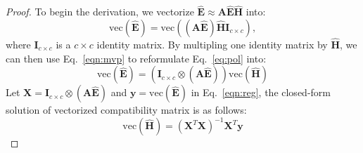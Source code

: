 \begin{proof}
To begin the derivation, we vectorize $\hat{{\boldsymbol E}} \approx {\boldsymbol A}\hat{{\boldsymbol E}}\hat{{\boldsymbol H}}$ into:
\begin{equation} \label{eq:pol}
    \text{vec}{(\hat{{\boldsymbol E}})} = \text{vec}{(({\boldsymbol A}\hat{{\boldsymbol E}})\hat{{\boldsymbol H}}{\boldsymbol I}_{c \times c})},
\end{equation}
where ${\boldsymbol I}_{c \times c}$ is a $c \times c$ identity matrix. 
By multipling one identity matrix by $\hat{{\boldsymbol H}}$, we can then use Eq.~\ref{eqn:mvp} to reformulate Eq.~\ref{eq:pol} into:
\begin{equation}
\text{vec}{(\hat{{\boldsymbol E}})} = ({\boldsymbol I}_{c \times c} \otimes ({\boldsymbol A}\hat{{\boldsymbol E}}))\text{vec}{(\hat{{\boldsymbol H}})}
\end{equation}
Let ${\boldsymbol X} = {\boldsymbol I}_{c \times c} \otimes ({\boldsymbol A}\hat{{\boldsymbol E}})$ and ${\boldsymbol y} = \text{vec}{(\hat{{\boldsymbol E}})}$ in Eq.~\ref{eqn:reg}, the closed-form solution of vectorized compatibility matrix is as follows:
\begin{equation}
    \text{vec}{(\hat{{\boldsymbol H}})} = ({\boldsymbol X}^{T}{\boldsymbol X})^{-1}{\boldsymbol X}^{T}{\boldsymbol y}
\end{equation}
\end{proof}

